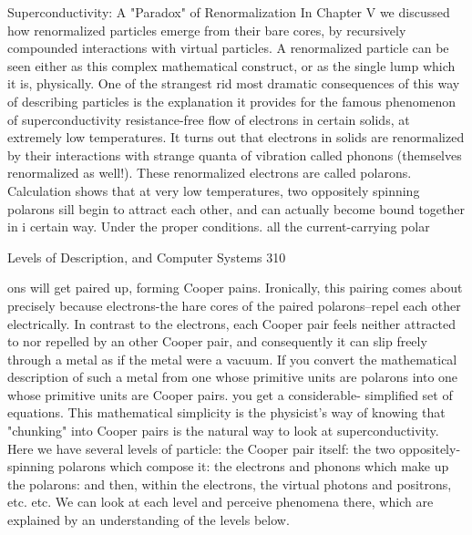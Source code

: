                    Superconductivity: A "Paradox" of Renormalization
       In Chapter V we discussed how renormalized particles emerge from their bare
       cores, by recursively compounded interactions with virtual particles. A
       renormalized particle can be seen either as this complex mathematical construct,
       or as the single lump which it is, physically. One of the strangest rid most
       dramatic consequences of this way of describing particles is the explanation it
       provides for the famous phenomenon of superconductivity resistance-free flow of
       electrons in certain solids, at extremely low temperatures.
               It turns out that electrons in solids are renormalized by their interactions
       with strange quanta of vibration called phonons (themselves renormalized as
       well!). These renormalized electrons are called polarons. Calculation shows that
       at very low temperatures, two oppositely spinning polarons sill begin to attract
       each other, and can actually become bound together in i certain way. Under the
       proper conditions. all the current-carrying polar




Levels of Description, and Computer Systems                                             310

       ons will get paired up, forming Cooper pains. Ironically, this pairing comes about
       precisely because electrons-the hare cores of the paired polarons--repel each other
       electrically. In contrast to the electrons, each Cooper pair feels neither attracted to
       nor repelled by an other Cooper pair, and consequently it can slip freely through a
       metal as if the metal were a vacuum. If you convert the mathematical description
       of such a metal from one whose primitive units are polarons into one whose
       primitive units are Cooper pairs. you get a considerable- simplified set of
       equations. This mathematical simplicity is the physicist's way of knowing that
       "chunking" into Cooper pairs is the natural way to look at superconductivity.
               Here we have several levels of particle: the Cooper pair itself: the two
       oppositely-spinning polarons which compose it: the electrons and phonons which
       make up the polarons: and then, within the electrons, the virtual photons and
       positrons, etc. etc. We can look at each level and perceive phenomena there,
       which are explained by an understanding of the levels below.

